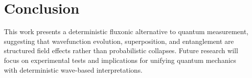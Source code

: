 \documentclass{article}
\begin{document}
\section{Conclusion}
This work presents a deterministic fluxonic alternative to quantum measurement, suggesting that wavefunction evolution, superposition, and entanglement are structured field effects rather than probabilistic collapses. Future research will focus on experimental tests and implications for unifying quantum mechanics with deterministic wave-based interpretations.
\end{document}
